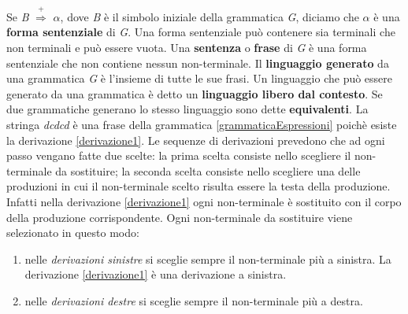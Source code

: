 Se \textit{B} $\overset{+}{\Rightarrow}$ $\alpha$, dove \textit{B} è il simbolo iniziale della grammatica \textit{G}, diciamo che $\alpha$ è una \textbf{forma sentenziale}  di \textit{G}. Una forma sentenziale può contenere sia terminali che non terminali e può essere vuota. Una \textbf{sentenza} o \textbf{frase} di \textit{G} è una forma sentenziale che non contiene nessun non-terminale. Il \textbf{linguaggio generato} da una grammatica \textit{G} è l'insieme di tutte le sue frasi. Un linguaggio che può essere generato da una grammatica è detto un \textbf{linguaggio libero dal contesto}. Se due grammatiche generano lo stesso linguaggio sono dette \textbf{equivalenti}. La stringa \textit{dcdcd} è una frase della grammatica \ref{grammaticaEspressioni} poichè esiste la derivazione \ref{derivazione1}. Le sequenze di derivazioni prevedono che ad ogni passo vengano fatte due scelte: la prima scelta consiste nello scegliere il non-terminale da sostituire; la seconda scelta consiste nello scegliere una delle produzioni in cui il non-terminale scelto risulta essere la testa della produzione. Infatti nella derivazione \ref{derivazione1} ogni non-terminale è sostituito con il corpo della produzione corrispondente. Ogni non-terminale da sostituire viene selezionato in questo modo:
\begin{enumerate}
	\item nelle \textit{derivazioni sinistre} si sceglie sempre il non-terminale più a sinistra. La derivazione \ref{derivazione1} è una derivazione a sinistra.
	\item  nelle \textit{derivazioni destre} si sceglie sempre il non-terminale più a destra. 
\end{enumerate}
